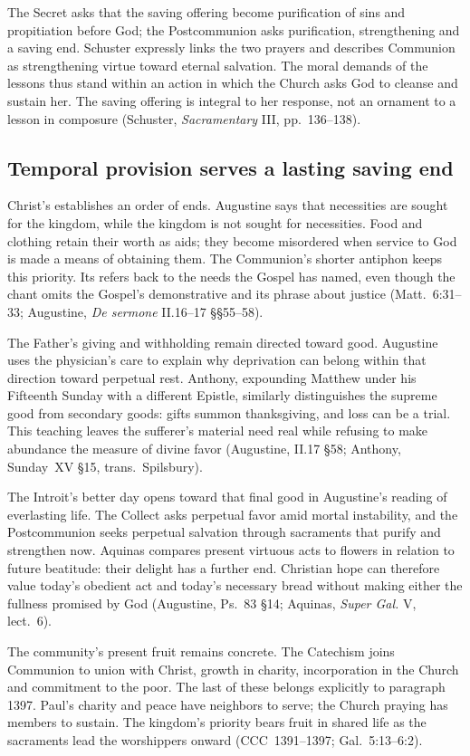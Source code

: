 The Secret asks that the saving offering become purification of sins and
propitiation before God; the Postcommunion asks purification, strengthening
and a saving end. Schuster expressly links the two prayers and describes
Communion as strengthening virtue toward eternal salvation. The moral demands
of the lessons thus stand within an action in which the Church asks God to
cleanse and sustain her. The saving offering is integral to her response,
not an ornament to a lesson in composure (Schuster, \emph{Sacramentary} III,
pp.~136--138).

\subsection*{Temporal provision serves a lasting saving end\enspace{}}

Christ's  establishes an order of ends. Augustine says that
necessities are sought for the kingdom, while the kingdom is not sought for
necessities. Food and clothing retain their worth as aids; they become
misordered when service to God is made a means of obtaining them. The
Communion's shorter antiphon keeps this priority. Its  refers
back to the needs the Gospel has named, even though the chant omits the
Gospel's demonstrative and its phrase about justice (Matt.~6:31--33;
Augustine, \emph{De sermone} II.16--17 §§55--58).

The Father's giving and withholding remain directed toward good. Augustine
uses the physician's care to explain why deprivation can belong within that
direction toward perpetual rest. Anthony, expounding Matthew under his
Fifteenth Sunday with a different Epistle, similarly distinguishes the supreme
good from secondary goods: gifts summon thanksgiving, and loss can be a
trial. This teaching leaves the sufferer's material need real while refusing
to make abundance the measure of divine favor (Augustine, II.17 §58;
Anthony, Sunday~XV §15, trans.~Spilsbury).

The Introit's better day opens toward that final good in Augustine's reading
of everlasting life. The Collect asks perpetual favor amid mortal
instability, and the Postcommunion seeks perpetual salvation through
sacraments that purify and strengthen now. Aquinas compares present virtuous
acts to flowers in relation to future beatitude: their delight has a further
end. Christian hope can therefore value today's obedient act and today's
necessary bread without making either the fullness promised by God
(Augustine, Ps.~83 §14; Aquinas, \emph{Super Gal.} V, lect.~6).

The community's present fruit remains concrete. The Catechism joins Communion
to union with Christ, growth in charity, incorporation in the Church and
commitment to the poor. The last of these belongs explicitly to paragraph
1397. Paul's charity and peace have neighbors to serve; the Church praying
 has members to sustain. The kingdom's priority bears fruit in
shared life as the sacraments lead the worshippers onward
(CCC~1391--1397; Gal.~5:13--6:2).

\endgroup
\clearpage
